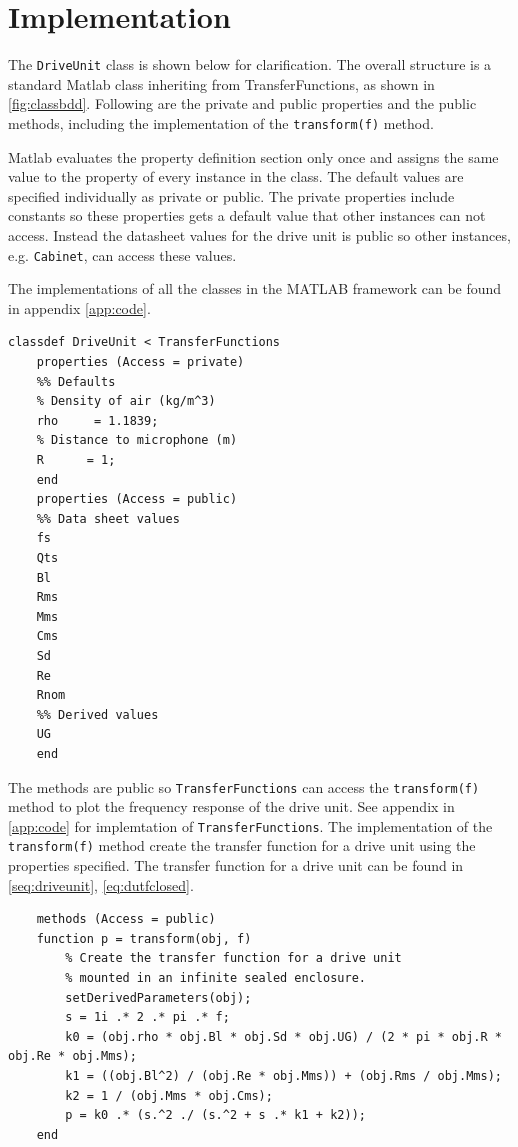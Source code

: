 \section{Implementation}
The \texttt{DriveUnit} class is shown below for clarification. 
The overall structure is a standard Matlab class inheriting from TransferFunctions, as shown in \cref{fig:classbdd}. 
Following are the private and public properties and the public methods, including the implementation of the \texttt{transform(f)} method.

Matlab evaluates the property definition section only once and assigns the same value to the property of every instance in the class.
The default values are specified individually as private or public.
The private properties include constants so these properties gets a default value that other instances can not access. 
Instead the datasheet values for the drive unit is public so other instances, e.g. \texttt{Cabinet}, can access these values.

The implementations of all the classes in the MATLAB framework can be found in appendix \ref{app:code}. 


\begin{verbatim}
classdef DriveUnit < TransferFunctions
    properties (Access = private)
	%% Defaults
	% Density of air (kg/m^3)
	rho     = 1.1839;
	% Distance to microphone (m)
	R      = 1;
	end
    properties (Access = public)
	%% Data sheet values
	fs
	Qts
	Bl
	Rms
	Mms
	Cms
	Sd
	Re
	Rnom
	%% Derived values
	UG
    end
\end{verbatim}

The methods are public so \texttt{TransferFunctions} can access the \texttt{transform(f)} method to plot the frequency response of the drive unit. See appendix in \cref{app:code} for implemtation of \texttt{TransferFunctions}.
The implementation of the \texttt{transform(f)} method create the transfer function for a drive unit using the properties specified.
The transfer function for a drive unit can be found in \cref{seq:driveunit}, \cref{eq:dutfclosed}.

\begin{verbatim}
    methods (Access = public)
	function p = transform(obj, f)
	    % Create the transfer function for a drive unit
	    % mounted in an infinite sealed enclosure.
	    setDerivedParameters(obj);
	    s = 1i .* 2 .* pi .* f;
	    k0 = (obj.rho * obj.Bl * obj.Sd * obj.UG) / (2 * pi * obj.R * obj.Re * obj.Mms);
	    k1 = ((obj.Bl^2) / (obj.Re * obj.Mms)) + (obj.Rms / obj.Mms);
	    k2 = 1 / (obj.Mms * obj.Cms);
	    p = k0 .* (s.^2 ./ (s.^2 + s .* k1 + k2));
	end
\end{verbatim}

